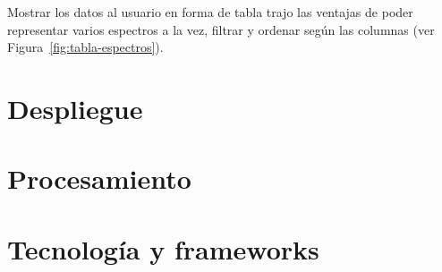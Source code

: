 Mostrar los datos al usuario en forma de tabla trajo las ventajas de poder
representar varios espectros a la vez, filtrar y ordenar según las columnas (ver
Figura~\ref{fig:tabla-espectros}).


\section{Despliegue}\label{sec:despliegue}


\section{Procesamiento}

\section{Tecnología y frameworks}



